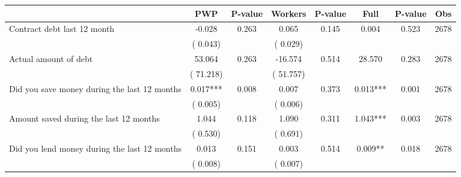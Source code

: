 
\begin{tabular}{l*{7}{c}}\hline&\multicolumn{1}{c}{PWP}&\multicolumn{1}{c}{P-value}&\multicolumn{1}{c}{Workers}&\multicolumn{1}{c}{P-value}&\multicolumn{1}{c}{Full}&\multicolumn{1}{c}{P-value}&\multicolumn{1}{c}{Obs} \\ \hline

 Contract debt last 12 month       &             -0.028       &        0.263  &              0.065       &        0.145  &              0.004       &              0.523 &  2678 \\ 
                       &       (       0.043)             &                               &       (       0.029)                     &                               &                                               &                                &                      \\ 

 Actual amount of debt       &             53.064       &        0.263  &            -16.574       &        0.514  &             28.570       &              0.283 &  2678 \\ 
                       &       (      71.218)             &                               &       (      51.757)                     &                               &                                               &                                &                      \\ 

 Did you save money during the last 12 months       &              0.017***       &        0.008  &              0.007       &        0.373  &              0.013***       &              0.001 &  2678 \\ 
                       &       (       0.005)             &                               &       (       0.006)                     &                               &                                               &                                &                      \\ 

 Amount saved during the last 12 months       &              1.044       &        0.118  &              1.090       &        0.311  &              1.043***       &              0.003 &  2678 \\ 
                       &       (       0.530)             &                               &       (       0.691)                     &                               &                                               &                                &                      \\ 

 Did you lend money during the last 12 months       &              0.013       &        0.151  &              0.003       &        0.514  &              0.009**       &              0.018 &  2678 \\ 
                       &       (       0.008)             &                               &       (       0.007)                     &                               &                                               &                                &                      \\ 

\hline \end{tabular}
